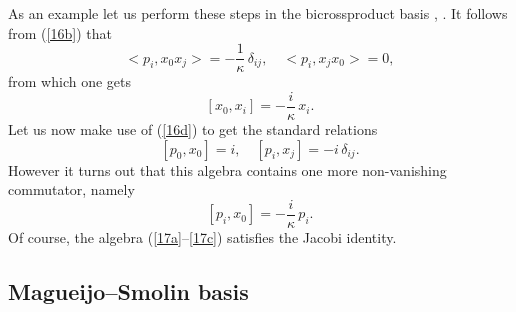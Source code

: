 \documentclass[a4paper,a4paper]{article}
\begin{document}
As an example let us perform these steps in the bicrossproduct basis \cite{maru}, \cite{crossalg}.
It follows from (\ref{16b}) that
$$
<p_i, x_0 x_j> = -\frac1\kappa\, \delta_{ij}, \quad <p_i,  x_jx_0>=0,
$$
from which one gets
\begin{equation}\label{17a}
[x_0, x_i] = -\frac{i}\kappa\, x_i.
\end{equation}
Let us now make use of (\ref{16d}) to get the standard relations
\begin{equation}\label{17b}
[p_0, x_0] = i, \quad [p_i, x_j] = -i \, \delta_{ij}.
\end{equation}
However it turns out that this algebra contains one more
non-vanishing commutator, namely
\begin{equation}\label{17c}
 [p_i, x_0] = -\frac{i}\kappa\, p_i.
\end{equation}
Of course, the algebra (\ref{17a}--\ref{17c}) satisfies the Jacobi identity.


\subsection{Magueijo--Smolin basis}
\end{document}
